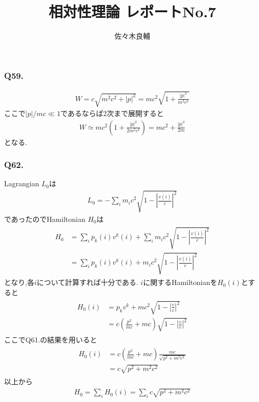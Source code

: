 \documentclass[uplatex,a4j,11pt,dvipdfmx]{jsarticle}
\begin{document}
\title{相対性理論 レポートNo.7}
\author{佐々木良輔}
\date{}
\maketitle
\subsubsection*{Q59.}
\begin{align}
  W=c\sqrt{m^2c^2+|p|^2}=mc^2\sqrt{1+\frac{|p|^2}{m^2c^2}}
\end{align}
ここで$|p|/mc\ll 1$であるならば2次まで展開すると
\begin{align}
  W\simeq mc^2(1+\frac{|p|^2}{2m^2c^2})=mc^2+\frac{|p|^2}{2m}
\end{align}
となる.
\subsubsection*{Q62.}
Lagrangian $L_0$は
\begin{align}
  L_0=-\sum_i m_ic^2\sqrt{1-\left|\frac{v(i)}{c}\right|^2}
\end{align}
であったのでHamiltonian $H_0$は
\begin{align}
  \begin{split}
    H_0&=\sum_ip_k(i)v^k(i)+\sum_im_ic^2\sqrt{1-\left|\frac{v(i)}{c}\right|^2}\\
    &=\sum_ip_k(i)v^k(i)+m_ic^2\sqrt{1-\left|\frac{v(i)}{c}\right|^2}
  \end{split}
\end{align}
となり,各$i$について計算すれば十分である.
$i$に関するHamiltonianを$H_0(i)$とすると
\begin{align}
  \begin{split}
    H_0(i)&=p_kv^k+mc^2\sqrt{1-\left|\frac{v}{c}\right|^2}\\
    &=c\left(\frac{p^2}{mc}+mc\right)\sqrt{1-\left|\frac{v}{c}\right|^2}
  \end{split}
\end{align}
ここでQ61.の結果を用いると
\begin{align}
  \begin{split}
    H_0(i)&=c\left(\frac{p^2}{mc}+mc\right)\frac{mc}{\sqrt{p^2+m^2c^2}}\\
    &=c\sqrt{p^2+m^2c^2}
  \end{split}
\end{align}
以上から
\begin{align}
  H_0=\sum_iH_0(i)=\sum_ic\sqrt{p^2+m^2c^2}
\end{align}
\end{document}

